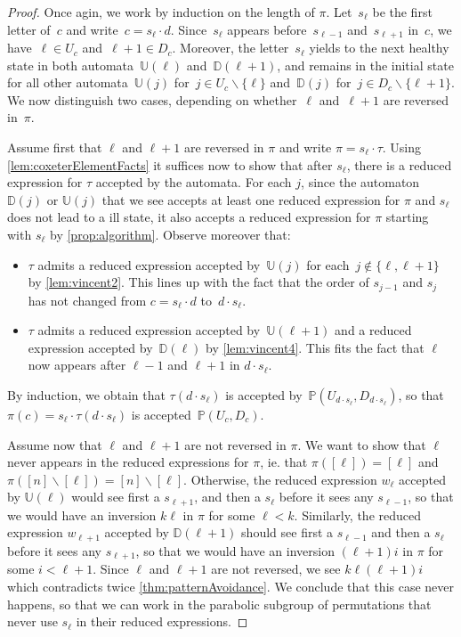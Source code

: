 \documentclass{amsart}
\newcommand{\ssm}{\smallsetminus} %
\newcommand{\automatonP}{\mathbb{P}} %
\newcommand{\automatonU}{\mathbb{U}} %
\newcommand{\automatonD}{\mathbb{D}} %
\begin{document}
\begin{proof}
Once agin, we work by induction on the length of $\pi$.
Let~$s_\ell$ be the first letter of~$c$ and write~$c = s_\ell \cdot d$.
Since~$s_\ell$ appears before~$s_{\ell-1}$ and~$s_{\ell+1}$ in~$c$, we have~$\ell \in U_c$ and~$\ell+1 \in D_c$.
Moreover, the letter~$s_\ell$ yields to the next healthy state in both automata~$\automatonU(\ell)$ and~$\automatonD(\ell+1)$, and remains in the initial state for all other automata~$\automatonU(j)$ for~$j \in U_c \ssm \{\ell\}$ and~$\automatonD(j)$ for~$j \in D_c \ssm \{\ell+1\}$.
We now distinguish two cases, depending on whether~$\ell$ and~$\ell+1$ are reversed in~$\pi$.

Assume first that $\ell$ and $\ell+1$ are reversed in $\pi$ and write $\pi = s_\ell \cdot \tau$. Using \cref{lem:coxeterElementFacts} it suffices now to show that after $s_\ell$, there is a reduced expression for $\tau$ accepted by the automata. For each $j$, since the automaton $\automatonD(j)$ or $\automatonU(j)$ that we see accepts at least one reduced expression for $\pi$ and $s_\ell$ does not lead to a ill state, it also accepts a reduced expression for $\pi$ starting with $s_\ell$ by \cref{prop:algorithm}. Observe moreover that:
\begin{itemize}
\item $\tau$ admits a reduced expression accepted by~$\automatonU(j)$ for each~$j \notin \{\ell, \ell+1\}$ by \cref{lem:vincent2}. This lines up with the fact that the order of $s_{j-1}$ and $s_j$ has not changed from $c = s_\ell \cdot d$ to~$d \cdot s_\ell$.
\item $\tau$ admits a reduced expression accepted by~$\automatonU(\ell+1)$ and a reduced expression accepted by~$\automatonD(\ell)$ by \cref{lem:vincent4}. This fits the fact that $\ell$ now appears after $\ell-1$ and $\ell+1$ in $d \cdot s_\ell$.
\end{itemize}
By induction, we obtain that $\tau(d \cdot s_\ell)$ is accepted by~$\automatonP(U_{d \cdot s_\ell}, D_{d \cdot s_\ell})$, so that $\pi(c) = s_\ell \cdot \tau(d \cdot s_\ell)$ is accepted~$\automatonP(U_c, D_c)$.
	
Assume now that $\ell$ and $\ell+1$ are not reversed in $\pi$. We want to show that $\ell$ never appears in the reduced expressions for $\pi$, ie. that $\pi([\ell]) = [\ell]$ and $\pi([n] \ssm [\ell]) = [n] \ssm [\ell]$. Otherwise, the reduced expression $w_\ell$ accepted by $\automatonU(\ell)$ would see first a $s_{\ell+1}$, and then a $s_\ell$ before it sees any $s_{\ell-1}$, so that we would have an inversion $k \ell$ in $\pi$ for some $\ell < k$. Similarly, the reduced expression $w_{\ell+1}$ accepted by $\automatonD(\ell+1)$ should see first a $s_{\ell-1}$ and then a $s_\ell$ before it sees any $s_{\ell+1}$, so that we would have an inversion $(\ell+1) i$ in $\pi$ for some $i < \ell+1$. Since $\ell$ and $\ell+1$ are not reversed, we see $k \ell (\ell+1) i$ which contradicts twice \cref{thm:patternAvoidance}. We conclude that this case never happens, so that we can work in the parabolic subgroup of permutations that never use $s_\ell$ in their reduced expressions.
\end{proof}
\end{document}
